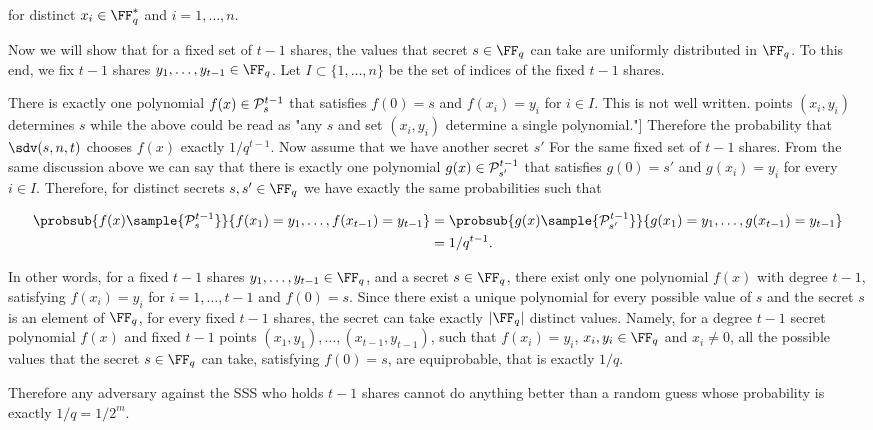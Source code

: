 \documentclass[envcountsame,runningheads,notitlepage]{llncs}
\DeclareRobustCommand{\michals}[2] {{\color{magenta}{$\big[$\scriptsize\textsf{Michal #1:}} #2$\big]$}}
\begin{document}
	for distinct $x_i \in \FF_q^*$ and $i = 1, \ldots, n$.
	
	Now we will show that for a fixed set of $t-1$ shares, the values that secret $s \in \FF_q$ can take are uniformly distributed in $\FF_q$. 
	To this end, we fix $t-1$ shares $y_1, \ldots, y_{t-1} \in \FF_q$. Let  $I \subset \{1, \ldots, n\}$ be the set of indices of the fixed $t-1$ shares. 
	
	There is exactly one polynomial $f(x) \in {\mathcal P}_{s}^{t - 1}$ that satisfies $f(0) = s$ and $f(x_{i}) = y_{i}$ for $i \in I$. \michals{29.03}{This is not well written. points $(x_i, y_i)$ determines $s$ while the above could be read as "any $s$ and set $(x_i, y_i)$ determine a single polynomial."}
	Therefore the probability that $\sdv(s, n, t)$ chooses $f(x)$ exactly $1/q^{t-1}$.
	Now assume that we have another secret $s'$ For the same fixed set of $t-1$ shares.  
	From the same discussion above we can say that there is exactly one polynomial $g(x) \in {\mathcal P}_{s'}^{t - 1}$ that satisfies $g(0) = s'$ and $g(x_{i}) = y_{i}$ for every $i \in I$.
	Therefore, for distinct secrets $s,s' \in \FF_q$ we have exactly the same probabilities such that
	
	\begin{align*}
	\probsub{f(x) \sample {\sP_{s}^{t - 1}}}{f(x_1) = y_1, \ldots, f(x_{t-1}) = y_{t-1}} &= \probsub{g(x) \sample {\sP_{s'}^{t - 1}}}{g(x_1) = y_1, \ldots, g(x_{t-1}) = y_{t-1}} \\
	&= 1/q^{t-1}.
	\end{align*}
	
	In other words, for a fixed $t-1$ shares $y_1, \ldots, y_{t-1} \in \FF_q$, and a secret $s \in \FF_q$, there exist only one polynomial $f(x)$ with degree $t-1$, satisfying $f(x_i) = y_i$ for $i = 1, \ldots, t-1$ and $f(0) = s$.
	Since there exist a unique polynomial for every possible value of $s$ and the secret $s$ is an element of $\FF_q$, for every fixed $t-1$ shares, the secret can take exactly $|\FF_q|$ distinct values. 
	Namely, for a  degree $t - 1$ secret polynomial $f(x)$ and fixed $t-1$ points $(x_1, y_1), \ldots, (x_{t-1}, y_{t-1})$, such that $f(x_i) = y_i$, $x_i, y_i \in \FF_q$ and $x_i \neq 0$, all the possible values that the secret $s \in \FF_q$ can take, satisfying $f(0) = s$, are equiprobable, that is exactly $1/q$.  
	
	Therefore any adversary against the SSS who holds $t-1$ shares cannot do anything better than a random guess whose probability is exactly $1/q = 1/2^m$.
	
\end{document}
